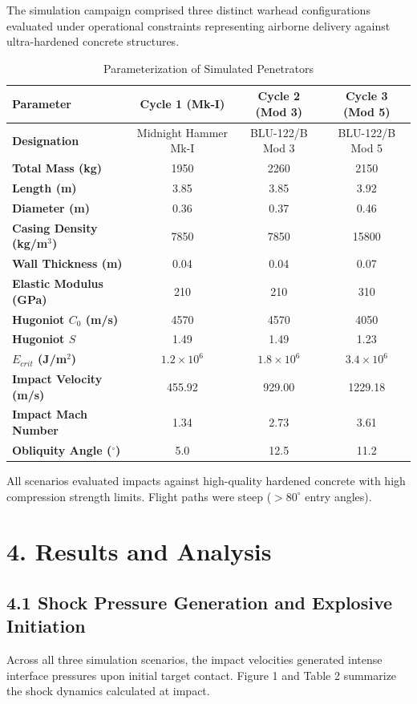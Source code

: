 \documentclass[journal,10pt,twocolumn]{IEEEtran}
\begin{document}
The simulation campaign comprised three distinct warhead configurations evaluated under operational constraints representing airborne delivery against ultra-hardened concrete structures.

\begin{table}[htbp]
\caption{Parameterization of Simulated Penetrators}
\begin{center}
\begin{tabular}{lccc}
\toprule
\textbf{Parameter} & \textbf{Cycle 1 (Mk-I)} & \textbf{Cycle 2 (Mod 3)} & \textbf{Cycle 3 (Mod 5)} \\
\midrule
\textbf{Designation} & Midnight Hammer Mk-I & BLU-122/B Mod 3 & BLU-122/B Mod 5 \\
\textbf{Total Mass (kg)} & 1950 & 2260 & 2150 \\
\textbf{Length (m)} & 3.85 & 3.85 & 3.92 \\
\textbf{Diameter (m)} & 0.36 & 0.37 & 0.46 \\
\textbf{Casing Density (kg/m$^3$)} & 7850 & 7850 & 15800 \\
\textbf{Wall Thickness (m)} & 0.04 & 0.04 & 0.07 \\
\textbf{Elastic Modulus (GPa)} & 210 & 210 & 310 \\
\textbf{Hugoniot $C_0$ (m/s)} & 4570 & 4570 & 4050 \\
\textbf{Hugoniot $S$} & 1.49 & 1.49 & 1.23 \\
\textbf{$E_{crit}$ (J/m$^2$)} & $1.2 \times 10^6$ & $1.8 \times 10^6$ & $3.4 \times 10^6$ \\
\textbf{Impact Velocity (m/s)} & 455.92 & 929.00 & 1229.18 \\
\textbf{Impact Mach Number} & 1.34 & 2.73 & 3.61 \\
\textbf{Obliquity Angle ($^\circ$)} & 5.0 & 12.5 & 11.2 \\
\bottomrule
\end{tabular}
\end{center}
\end{table}

All scenarios evaluated impacts against high-quality hardened concrete with high compression strength limits. Flight paths were steep ($> 80^\circ$ entry angles).



\section{4. Results and Analysis}

\subsection{4.1 Shock Pressure Generation and Explosive Initiation}
Across all three simulation scenarios, the impact velocities generated intense interface pressures upon initial target contact. Figure 1 and Table 2 summarize the shock dynamics calculated at impact.
\end{document}
